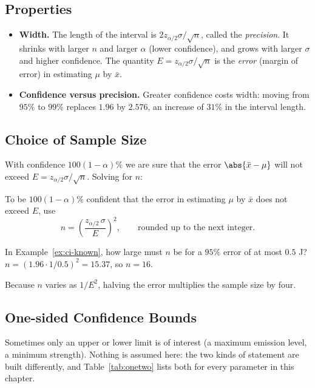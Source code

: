 \subsection*{Properties}

\begin{itemize}
  \item \textbf{Width.} The length of the interval is $2z_{\alpha/2}\sigma/\sqrt n$, called the \emph{precision}. It shrinks with larger $n$ and larger $\alpha$ (lower confidence), and grows with larger $\sigma$ and higher confidence. The quantity $E=z_{\alpha/2}\sigma/\sqrt n$ is the \emph{error} (margin of error) in estimating $\mu$ by $\bar{x}$.
  \item \textbf{Confidence versus precision.} Greater confidence costs width: moving from $95\%$ to $99\%$ replaces $1.96$ by $2.576$, an increase of $31\%$ in the interval length.
\end{itemize}

\subsection{Choice of Sample Size}

With confidence $100(1-\alpha)\%$ we are sure that the error $\abs{\bar{x}-\mu}$ will not exceed $E=z_{\alpha/2}\sigma/\sqrt n$. Solving for $n$:

\begin{theorem}\label{thm:samplesize-mean}
To be $100(1-\alpha)\%$ confident that the error in estimating $\mu$ by $\bar{x}$ does not exceed $E$, use
\[ n=\left(\frac{z_{\alpha/2}\,\sigma}{E}\right)^2,\qquad\text{rounded up to the next integer.} \]
\end{theorem}

\begin{example}
In Example~\ref{ex:ci-known}, how large must $n$ be for a $95\%$ error of at most $0.5$ J? $n=(1.96\cdot1/0.5)^2=15.37$, so $n=16$.
\end{example}

Because $n$ varies as $1/E^2$, halving the error multiplies the sample size by four.

\subsection{One-sided Confidence Bounds}

Sometimes only an upper or lower limit is of interest (a maximum emission level, a minimum strength). Nothing is assumed here: the two kinds of statement are built differently, and Table~\ref{tab:onetwo} lists both for every parameter in this chapter.

